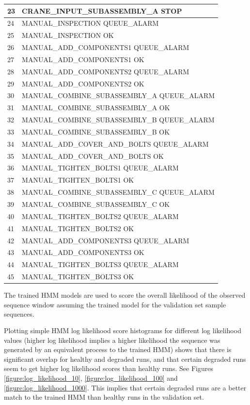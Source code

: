 \documentclass[journal]{IEEEtran}
\begin{document}
\begin{table}[!t]
\begin{tabular}{|p{5mm}|p{55mm}|}
\hline
23 & CRANE\_INPUT\_SUBASSEMBLY\_A STOP \\
\hline
24 & MANUAL\_INSPECTION QUEUE\_ALARM \\
\hline
25 & MANUAL\_INSPECTION OK \\
\hline
26 & MANUAL\_ADD\_COMPONENTS1 QUEUE\_ALARM \\
\hline
27 & MANUAL\_ADD\_COMPONENTS1 OK \\
\hline
28 & MANUAL\_ADD\_COMPONENTS2 QUEUE\_ALARM \\
\hline
29 & MANUAL\_ADD\_COMPONENTS2 OK \\
\hline
30 & MANUAL\_COMBINE\_SUBASSEMBLY\_A QUEUE\_ALARM \\
\hline
31 & MANUAL\_COMBINE\_SUBASSEMBLY\_A OK \\
\hline
32 & MANUAL\_COMBINE\_SUBASSEMBLY\_B QUEUE\_ALARM \\
\hline
33 & MANUAL\_COMBINE\_SUBASSEMBLY\_B OK \\
\hline
34 & MANUAL\_ADD\_COVER\_AND\_BOLTS QUEUE\_ALARM \\
\hline
35 & MANUAL\_ADD\_COVER\_AND\_BOLTS OK \\
\hline
36 & MANUAL\_TIGHTEN\_BOLTS1 QUEUE\_ALARM \\
\hline
37 & MANUAL\_TIGHTEN\_BOLTS1 OK \\
\hline
38 & MANUAL\_COMBINE\_SUBASSEMBLY\_C QUEUE\_ALARM \\
\hline
39 & MANUAL\_COMBINE\_SUBASSEMBLY\_C OK \\
\hline
40 & MANUAL\_TIGHTEN\_BOLTS2 QUEUE\_ALARM \\
\hline
41 & MANUAL\_TIGHTEN\_BOLTS2 OK \\
\hline
42 & MANUAL\_ADD\_COMPONENTS3 QUEUE\_ALARM \\
\hline
43 & MANUAL\_ADD\_COMPONENTS3 OK \\
\hline
44 & MANUAL\_TIGHTEN\_BOLTS3 QUEUE\_ALARM \\
\hline
45 & MANUAL\_TIGHTEN\_BOLTS3 OK \\
\hline
\end{tabular}
\end{table}

The trained HMM models are used to score the overall likelihood of the observed sequence window assuming the trained model for the validation set sample sequences.

Plotting simple HMM log likelihood score histograms for different log likelihood values (higher log likelihood implies a higher likelihood the sequence was generated by an equivalent process to the trained HMM) shows that there is significant overlap for healthy and degraded runs, and that certain degraded runs seem to get higher log likelihood scores than healthy runs. See Figures \ref{figure:log_likelihood_10}, \ref{figure:log_likelihood_100} and \ref{figure:log_likelihood_1000}. This implies that certain degraded runs are a better match to the trained HMM than healthy runs in the validation set.
\end{document}
